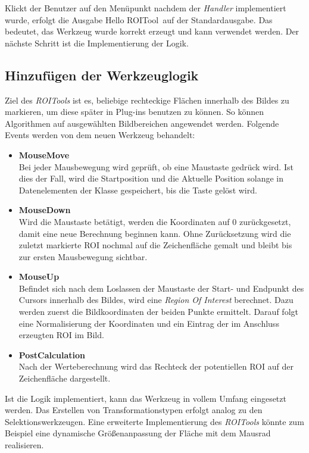 Klickt der Benutzer auf den Menüpunkt nachdem der \textit{Handler} implementiert wurde, erfolgt die Ausgabe \glqq Hello ROITool\grqq\ auf der Standardausgabe. Das bedeutet, das Werkzeug wurde korrekt erzeugt und kann verwendet werden. Der nächste Schritt ist die Implementierung der Logik.

\subsection{Hinzufügen der Werkzeuglogik}

Ziel des \textit{ROITools} ist es, beliebige rechteckige Flächen innerhalb des Bildes zu markieren, um diese später in Plug-ins benutzen zu können. So können Algorithmen auf ausgewählten Bildbereichen angewendet werden. Folgende Events werden von dem neuen Werkzeug behandelt:

\begin{itemize}
\item \textbf{MouseMove} \\
Bei jeder Mausbewegung wird geprüft, ob eine Maustaste gedrück wird. Ist dies der Fall, wird die Startposition und die Aktuelle Position solange in Datenelementen der Klasse gespeichert, bis die Taste gelöst wird.
\item \textbf{MouseDown} \\
Wird die Maustaste betätigt, werden die Koordinaten auf $0$ zurückgesetzt, damit eine neue Berechnung beginnen kann. Ohne Zurücksetzung wird die zuletzt markierte ROI nochmal auf die Zeichenfläche gemalt und bleibt bis zur ersten Mausbewegung sichtbar.
\item \textbf{MouseUp} \\
 Befindet sich nach dem Loslassen der Maustaste der Start- und Endpunkt des Cursors innerhalb des Bildes, wird eine \textit{Region Of Interest} berechnet. Dazu werden zuerst die Bildkoordinaten der beiden Punkte ermittelt. Darauf folgt eine Normalisierung der Koordinaten und ein Eintrag der im Anschluss erzeugten ROI im Bild.
\item \textbf{PostCalculation} \\
Nach der Werteberechnung wird das Rechteck der potentiellen ROI auf der Zeichenfläche dargestellt.
\end{itemize}


Ist die Logik implementiert, kann das Werkzeug in vollem Umfang eingesetzt werden. Das Erstellen von Transformationstypen erfolgt analog zu den Selektionswerkzeugen. Eine erweiterte Implementierung des \textit{ROITools} könnte zum Beispiel eine dynamische Größenanpassung der Fläche mit dem Mausrad realisieren.
